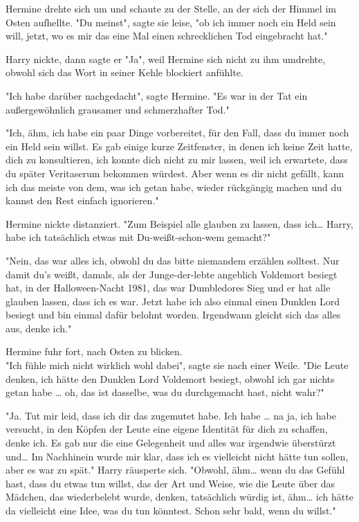 {Hermine drehte sich um und schaute zu der Stelle, an der sich der Himmel im Osten aufhellte. "Du meinst", sagte sie leise, "ob ich immer noch ein Held sein will, jetzt, wo es mir das eine Mal einen schrecklichen Tod eingebracht hat."

Harry nickte, dann sagte er "Ja", weil Hermine sich nicht zu ihm umdrehte, obwohl sich das Wort in seiner Kehle blockiert anfühlte.

"Ich habe darüber nachgedacht", sagte Hermine. "Es war in der Tat ein außergewöhnlich grausamer und schmerzhafter Tod."

"Ich, ähm, ich habe ein paar Dinge vorbereitet, für den Fall, dass du immer noch ein Held sein willst. Es gab einige kurze Zeitfenster, in denen ich keine Zeit hatte, dich zu konsultieren, ich konnte dich nicht zu mir lassen, weil ich erwartete, dass du später Veritaserum bekommen würdest. Aber wenn es dir nicht gefällt, kann ich das meiste von dem, was ich getan habe, wieder rückgängig machen und du kannst den Rest einfach ignorieren."

Hermine nickte distanziert. "Zum Beispiel alle glauben zu lassen, dass ich… Harry, habe ich tatsächlich etwas mit Du-weißt-schon-wem gemacht?"

"Nein, das war alles ich, obwohl du das bitte niemandem erzählen solltest. Nur damit du's weißt, damals, als der Junge-der-lebte angeblich Voldemort besiegt hat, in der Halloween-Nacht 1981, das war Dumbledores Sieg und er hat alle glauben lassen, dass ich es war. Jetzt habe ich also einmal einen Dunklen Lord besiegt und bin einmal dafür belohnt worden. Irgendwann gleicht sich das alles aus, denke ich."

Hermine fuhr fort, nach Osten zu blicken.\\ "Ich fühle mich nicht wirklich wohl dabei", sagte sie nach einer Weile. "Die Leute denken, ich hätte den Dunklen Lord Voldemort besiegt, obwohl ich gar nichts getan habe … oh, das ist dasselbe, was du durchgemacht hast, nicht wahr?"

"Ja. Tut mir leid, dass ich dir das zugemutet habe. Ich habe … na ja, ich habe versucht, in den Köpfen der Leute eine eigene Identität für dich zu schaffen, denke ich. Es gab nur die eine Gelegenheit und alles war irgendwie überstürzt und… Im Nachhinein wurde mir klar, dass ich es vielleicht nicht hätte tun sollen, aber es war zu spät." Harry räusperte sich. "Obwohl, ähm… wenn du das Gefühl hast, dass du etwas tun willst, das der Art und Weise, wie die Leute über das Mädchen, das wiederbelebt wurde, denken, tatsächlich würdig ist, ähm… ich hätte da vielleicht eine Idee, was du tun könntest. Schon sehr bald, wenn du willst."

}
